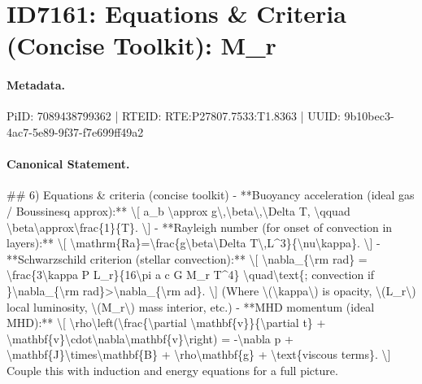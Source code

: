 \section*{ID7161: Equations \& Criteria (Concise Toolkit): M\_r}
\paragraph{Metadata.}
PiID: 7089438799362 | RTEID: RTE:P27807.7533:T1.8363 | UUID: 9b10bec3-4ac7-5e89-9f37-f7e699ff49a2

\paragraph{Canonical Statement.}
\#\# 6) Equations \& criteria (concise toolkit) - **Buoyancy acceleration (ideal gas / Boussinesq approx):** \textbackslash{}[ a\_b \textbackslash{}approx g\textbackslash{},\textbackslash{}beta\textbackslash{},\textbackslash{}Delta T, \textbackslash{}qquad \textbackslash{}beta\textbackslash{}approx\textbackslash{}frac\{1\}\{T\}. \textbackslash{}] - **Rayleigh number (for onset of convection in layers):** \textbackslash{}[ \textbackslash{}mathrm\{Ra\}=\textbackslash{}frac\{g\textbackslash{}beta\textbackslash{}Delta T\textbackslash{},L\textasciicircum{}3\}\{\textbackslash{}nu\textbackslash{}kappa\}. \textbackslash{}] - **Schwarzschild criterion (stellar convection):** \textbackslash{}[ \textbackslash{}nabla\_\{\textbackslash{}rm rad\} = \textbackslash{}frac\{3\textbackslash{}kappa P L\_r\}\{16\textbackslash{}pi a c G M\_r T\textasciicircum{}4\} \textbackslash{}quad\textbackslash{}text\{; convection if \}\textbackslash{}nabla\_\{\textbackslash{}rm rad\}>\textbackslash{}nabla\_\{\textbackslash{}rm ad\}. \textbackslash{}] (Where \textbackslash{}(\textbackslash{}kappa\textbackslash{}) is opacity, \textbackslash{}(L\_r\textbackslash{}) local luminosity, \textbackslash{}(M\_r\textbackslash{}) mass interior, etc.) - **MHD momentum (ideal MHD):** \textbackslash{}[ \textbackslash{}rho\textbackslash{}left(\textbackslash{}frac\{\textbackslash{}partial \textbackslash{}mathbf\{v\}\}\{\textbackslash{}partial t\} + \textbackslash{}mathbf\{v\}\textbackslash{}cdot\textbackslash{}nabla\textbackslash{}mathbf\{v\}\textbackslash{}right) = -\textbackslash{}nabla p + \textbackslash{}mathbf\{J\}\textbackslash{}times\textbackslash{}mathbf\{B\} + \textbackslash{}rho\textbackslash{}mathbf\{g\} + \textbackslash{}text\{viscous terms\}. \textbackslash{}] Couple this with induction and energy equations for a full picture.

